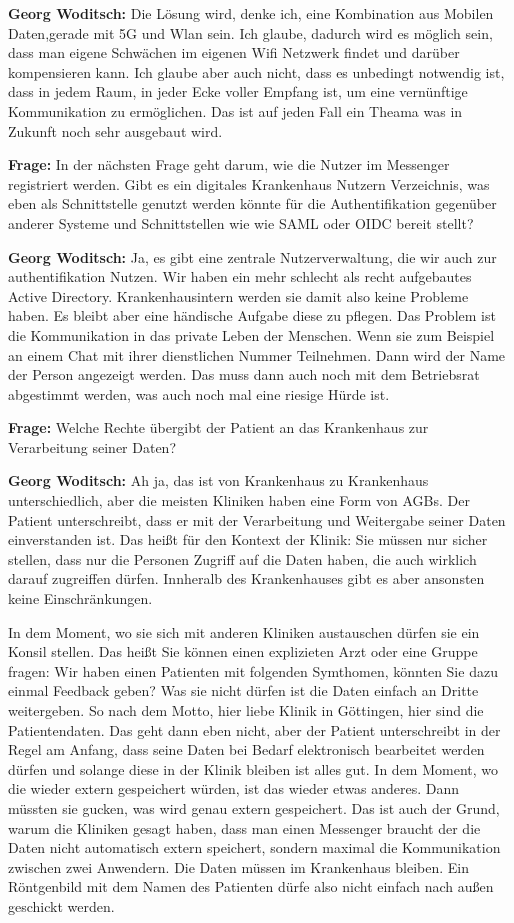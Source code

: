 \textbf{Georg Woditsch: } Die Lösung wird, denke ich, eine Kombination aus Mobilen Daten,gerade mit 5G und Wlan sein. Ich glaube, dadurch wird es möglich sein, dass man eigene Schwächen im eigenen Wifi Netzwerk findet und darüber kompensieren kann. Ich glaube aber auch nicht, dass es unbedingt notwendig ist, dass in jedem Raum, in jeder Ecke voller Empfang ist, um eine vernünftige Kommunikation zu ermöglichen. Das ist auf jeden Fall ein Theama was in Zukunft noch sehr ausgebaut wird.

\textbf{Frage: } In der nächsten Frage geht darum, wie die Nutzer im Messenger registriert werden. Gibt es ein digitales Krankenhaus Nutzern Verzeichnis, was eben als Schnittstelle genutzt werden könnte für die Authentifikation gegenüber anderer Systeme und Schnittstellen wie wie SAML oder OIDC bereit stellt?

\textbf{Georg Woditsch: } Ja, es gibt eine zentrale Nutzerverwaltung, die wir auch zur authentifikation Nutzen. Wir haben ein mehr schlecht als recht aufgebautes Active Directory. Krankenhausintern werden sie damit also keine Probleme haben. Es bleibt aber eine händische Aufgabe diese zu pflegen. Das Problem ist die Kommunikation in das private Leben der Menschen. Wenn sie zum Beispiel an einem Chat mit ihrer dienstlichen Nummer Teilnehmen. Dann wird der Name der Person angezeigt werden. Das muss dann auch noch mit dem Betriebsrat abgestimmt werden, was auch noch mal eine riesige Hürde ist.

\textbf{Frage: } Welche Rechte übergibt der Patient an das Krankenhaus zur Verarbeitung seiner Daten?

\textbf{Georg Woditsch: } Ah ja, das ist von Krankenhaus zu Krankenhaus unterschiedlich, aber die meisten Kliniken haben eine Form von AGBs. Der Patient unterschreibt, dass er mit der Verarbeitung und Weitergabe seiner Daten einverstanden ist. Das heißt für den Kontext der Klinik: Sie müssen nur sicher stellen, dass nur die Personen Zugriff auf die Daten haben, die auch wirklich darauf zugreiffen dürfen. Innheralb des Krankenhauses gibt es aber ansonsten keine Einschränkungen.

In dem Moment, wo sie sich mit anderen Kliniken austauschen dürfen sie ein Konsil stellen. Das heißt Sie können einen explizieten Arzt oder eine Gruppe fragen: Wir haben einen Patienten mit folgenden Symthomen, könnten Sie dazu einmal Feedback geben? Was sie nicht dürfen ist die Daten einfach an Dritte weitergeben. So nach dem Motto, hier liebe Klinik in Göttingen, hier sind die Patientendaten.  Das geht dann eben nicht, aber der Patient unterschreibt in der Regel am Anfang, dass seine Daten bei Bedarf elektronisch bearbeitet werden dürfen und solange diese in der Klinik bleiben ist alles gut. In dem Moment, wo die wieder extern gespeichert würden, ist das wieder etwas anderes. Dann müssten sie gucken, was wird genau extern gespeichert. Das ist auch  der Grund, warum die Kliniken gesagt haben, dass man einen Messenger braucht der die Daten nicht automatisch extern speichert, sondern maximal die Kommunikation zwischen zwei Anwendern. Die Daten müssen im Krankenhaus bleiben. Ein Röntgenbild mit dem Namen des Patienten dürfe also nicht einfach nach außen geschickt werden.

